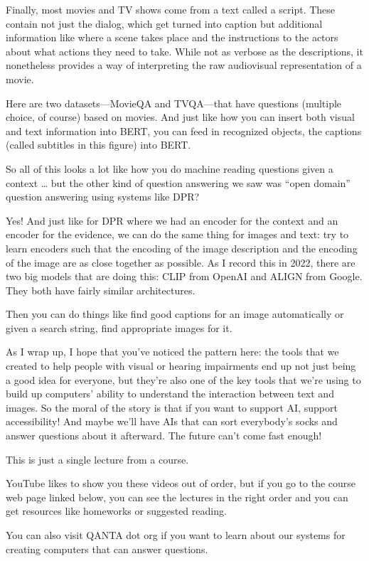 Finally, most movies and TV shows come from a text called a script.  These contain not just the dialog, which get turned into caption but additional information like where a scene takes place and the instructions to the actors about what actions they need to take.  While not as verbose as the descriptions, it nonetheless provides a way of interpreting the raw audiovisual representation of a movie.

Here are two datasets—MovieQA and TVQA—that have questions (multiple choice, of course) based on movies.  And just like how you can insert both visual and text information into BERT, you can feed in recognized objects, the captions (called subtitles in this figure) into BERT.

So all of this looks a lot like how you do machine reading questions given a context … but the other kind of question answering we saw was “open domain” question answering using systems like DPR?  

Yes!  And just like for DPR where we had an encoder for the context and an encoder for the evidence, we can do the same thing for images and text: try to learn encoders such that the encoding of the image description and the encoding of the image are as close together as possible.  As I record this in 2022, there are two big models that are doing this: CLIP from OpenAI and ALIGN from Google.  They both have fairly similar architectures.

Then you can do things like find good captions for an image automatically or given a search string, find appropriate images for it.

As I wrap up, I hope that you’ve noticed the pattern here: the tools that we created to help people with visual or hearing impairments end up not just being a good idea for everyone, but they’re also one of the key tools that we’re using to build up computers’ ability to understand the interaction between text and images.  So the moral of the story is that if you want to support AI, support accessibility!  And maybe we’ll have AIs that can sort everybody’s socks and answer questions about it afterward.  The future can’t come fast enough!

This is just a single lecture from a course.

YouTube likes to show you these videos out of order, but if you go to the course web page linked below, you can see the lectures in the right order and you can get resources like homeworks or suggested reading.

You can also visit QANTA dot org
if you want to learn about our systems for creating computers that can answer questions.

